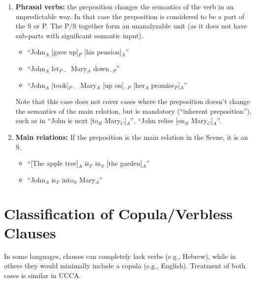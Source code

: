 \documentclass[11pt]{article}
\newcommand{\dcom}[1]{\textit{\color{blue}{#1}}}
\newcommand{\oa}[1]{{\color{blue}{OA: #1}}}
\newcommand{\nss}[1]{{\color{magenta}{NSS: #1}}}
\begin{document}
\begin{enumerate}
\item
{\bf Phrasal verbs:} the preposition changes the semantics of the verb in an unpredictable way. In that case the preposition is considered to be a part of the S or P. The P/S together form an unanalyzable unit (as it does not have sub-parts with significant semantic input).

\begin{itemize}
\item
``John$_A$ [gave up]$_P$ [his pension]$_A$''
\item
``John$_A$ let$_{P-}$ Mary$_A$ down$_{-P}$''
\item
``John$_A$ [took]$_{P-}$ Mary$_A$ [up on]$_{-P}$ [her$_A$ promise$_P$]$_A$'' 
\end{itemize}

Note that this case does not cover cases where the preposition doesn't change the semantics of the main relation, but is mandatory (``inherent preposition''), such as in ``John is next [to$_R$ Mary$_C$]$_A$'', ``John relies [on$_R$ Mary$_C$]$_A$''. 



\item
{\bf Main relations:} If the preposition is the main relation in the Scene, it is an S. %

\begin{itemize}
\item
``[The apple tree]$_A$ is$_F$ in$_S$ [the garden]$_A$''
\item
``John$_A$ is$_F$ into$_S$ Mary$_A$''
\end{itemize}

\end{enumerate}


\section{Classification of Copula/Verbless Clauses}\label{sec:copula_verbless}

In some languages, clauses can completely lack verbs (e.g., Hebrew), while in others they would minimally include a copula (e.g., English). Treatment of both cases is similar in UCCA.
\end{document}
